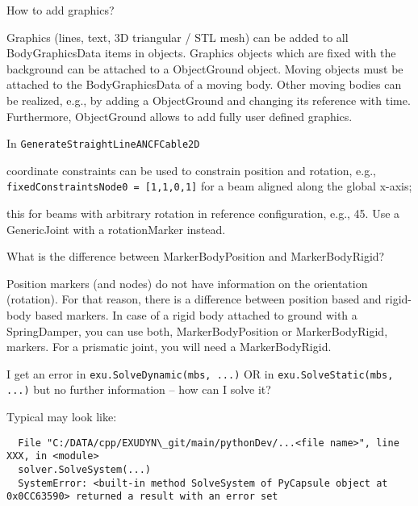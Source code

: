 \item How to add graphics?
\bi
\item[$\ra$] Graphics (lines, text, 3D triangular / \acs{STL} mesh) can be added to all BodyGraphicsData items in objects. Graphics objects which are fixed with the background can be attached to a ObjectGround object. Moving objects must be attached to the BodyGraphicsData of a moving body. Other moving bodies can be realized, e.g., by adding a ObjectGround and changing its reference with time. Furthermore, ObjectGround allows to add fully user defined graphics.
\ei
\item In \texttt{GenerateStraightLineANCFCable2D} 
\bi
\item[$\ra$] coordinate constraints can be used to constrain position and rotation, e.g., \texttt{fixedConstraintsNode0 = [1,1,0,1]} for a beam aligned along the global x-axis; 
\item[$\ra$] this  for beams with arbitrary rotation in reference configuration, e.g., 45\textdegree. Use a GenericJoint with a rotationMarker instead.
\ei
\item What is the difference between MarkerBodyPosition and MarkerBodyRigid?
\bi
\item[$\ra$] Position markers (and nodes) do not have information on the orientation (rotation). For that reason, there is a difference between position based and rigid-body based markers. In case of a rigid body attached to ground with a SpringDamper, you can use both, MarkerBodyPosition or MarkerBodyRigid, markers. For a prismatic joint, you will need a MarkerBodyRigid.
\ei
\item I get an error in \texttt{exu.SolveDynamic(mbs, ...)} OR in \texttt{exu.SolveStatic(mbs, ...)} but no further information -- how can I solve it?
\bi
\item[$\ra$] Typical  may look like:
\begin{lstlisting}
  File "C:/DATA/cpp/EXUDYN\_git/main/pythonDev/...<file name>", line XXX, in <module>
  solver.SolveSystem(...)
  SystemError: <built-in method SolveSystem of PyCapsule object at 0x0CC63590> returned a result with an error set
\end{lstlisting}
